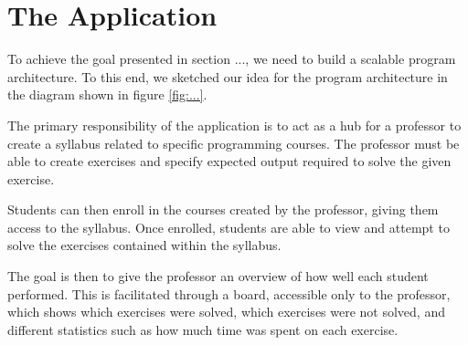 \chapter{The Application}
To achieve the goal presented in section ..., we need to build a scalable program architecture.
To this end, we sketched our idea for the program architecture in the diagram shown in figure \ref{fig:...}.


The primary responsibility of the application is to act as a hub for a professor to create a syllabus related to specific programming courses.
The professor must be able to create exercises and specify expected output required to solve the given exercise.

Students can then enroll in the courses created by the professor, giving them access to the syllabus.
Once enrolled, students are able to view and attempt to solve the exercises contained within the syllabus.

The goal is then to give the professor an overview of how well each student performed.
This is facilitated through a board, accessible only to the professor, which shows which exercises were solved, which exercises were not solved, and different statistics such as how much time was spent on each exercise.

